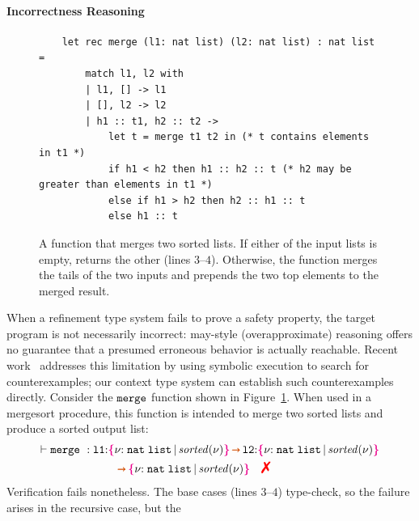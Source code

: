 \paragraph{Incorrectness Reasoning} %
\label{subsec:disprove}
\begin{figure}[h!]
  \centering
\vspace*{-.15in}
\begin{verbatim}
    let rec merge (l1: nat list) (l2: nat list) : nat list =
        match l1, l2 with
        | l1, [] -> l1
        | [], l2 -> l2
        | h1 :: t1, h2 :: t2 ->
            let t = merge t1 t2 in (* t contains elements in t1 *)
            if h1 < h2 then h1 :: h2 :: t (* h2 may be greater than elements in t1 *)
            else if h1 > h2 then h2 :: h1 :: t
            else h1 :: t
\end{verbatim}
\vspace*{-.1in}
\caption{A function that merges two sorted lists. If either of the
  input lists is empty,  returns the other (lines
  $3$--$4$). Otherwise, the function merges the tails of the two
  inputs and prepends the two top elements to the merged result. }
\label{fig:merge}
\vspace*{-.1in}
\end{figure}
When a refinement type system fails to prove a safety property, the
target program is not necessarily incorrect: may-style
(overapproximate) reasoning offers no guarantee that a presumed
erroneous behavior is actually reachable. Recent
work~\cite{RefinementTypeRefutations, RefinementTypeSymbolicExecution}
addresses this limitation by using symbolic execution to search for
counterexamples; our context type system can establish such
counterexamples directly.  Consider the ${\tt merge}$ function shown
in Figure~\ref{fig:merge}. When used in a mergesort procedure, this
function is intended to merge two sorted lists and produce a sorted
output list:
\vspace{-0.2em}
\begin{align*}
  \vdash \Code{merge}~:{}&\Code{l1}{:}\ort{\List[\Code{nat}]}{\I{sorted}(\vnu)}
  \ctsarr \Code{l2}{:}\ort{\List[\Code{nat}]}{\I{sorted}(\vnu)} \\
  &\qquad \ctsarr \ort{\List[\Code{nat}]}{\I{sorted}(\vnu)} \quad \judgfail
\end{align*}\noindent
Verification fails nonetheless. The base cases (lines $3$--$4$)
type-check, so the failure arises in the recursive case, but the
